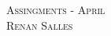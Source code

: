 \documentclass[landscape,a4paper]{article}
\begin{document}
\pagestyle{empty} %

\noindent



\begin{center}
\textsc{\LARGE Assingments - April}\\ %
\textsc{\large Renan Salles} %
\end{center}

\end{document}
